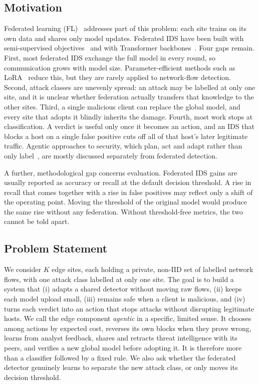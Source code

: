 \documentclass[conference]{IEEEtran}
\begin{document}
\subsection{Motivation}
Federated learning (FL)~\cite{mcmahan2017} addresses part of this problem:
each site trains on its own data and shares only model updates. Federated IDS
have been built with semi-supervised objectives~\cite{aouedi2022fluids} and
with Transformer backbones~\cite{devi2025fatvit}. Four gaps remain. First,
most federated IDS exchange the full model in every round, so communication
grows with model size. Parameter-efficient methods such as LoRA~\cite{hu2022lora}
reduce this, but they are rarely applied to network-flow detection. Second,
attack classes are unevenly spread: an attack may be labelled at only one
site, and it is unclear whether federation actually transfers that knowledge
to the other sites. Third, a single malicious client can replace the global
model, and every site that adopts it blindly inherits the damage. Fourth, most
work stops at classification. A verdict is useful only once it becomes an
action, and an IDS that blocks a host on a single false positive cuts off all
of that host's later legitimate traffic. Agentic approaches to security,
which plan, act and adapt rather than only label~\cite{panwar2025agentic},
are mostly discussed separately from federated detection.

A further, methodological gap concerns evaluation. Federated IDS gains are
usually reported as accuracy or recall at the default decision threshold.
A rise in recall that comes together with a rise in false positives may
reflect only a shift of the operating point. Moving the threshold of the
original model would produce the same rise without any federation. Without
threshold-free metrics, the two cannot be told apart.

\subsection{Problem Statement}
We consider $K$ edge sites, each holding a private, non-IID set of labelled
network flows, with one attack class labelled at only one site. The goal is
to build a system that (i) adapts a shared detector without moving raw flows,
(ii) keeps each model upload small, (iii) remains safe when a client is
malicious, and (iv) turns each verdict into an action that stops attacks
without disrupting legitimate hosts. We call the edge component
\emph{agentic} in a specific, limited sense. It chooses among actions by
expected cost, reverses its own blocks when they prove wrong, learns from
analyst feedback, shares and retracts threat intelligence with its peers,
and verifies a new global model before adopting it. It is therefore more than
a classifier followed by a fixed rule. We also ask whether the federated
detector genuinely learns to separate the new attack class, or only moves
its decision threshold.
\end{document}
